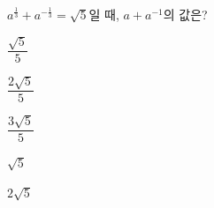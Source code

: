 $a^{\frac{1}{3}}+a^{-\frac{1}{3}}=\sqrt{5}$일 때, $a+a^{-1}$의 값은? 
\begin{choices32}{\rule[-3ex]{0pt}{8ex}$\dfrac{\sqrt{5}}{5}$}{\rule[-3ex]{0pt}{8ex}$\dfrac{2\sqrt{5}}{5}$}{\rule[-3ex]{0pt}{8ex}$\dfrac{3\sqrt{5}}{5}$}{\rule[-3ex]{0pt}{8ex}$\sqrt{5}$}{\rule[-3ex]{0pt}{8ex}$2\sqrt{5}$}\end{choices32}
